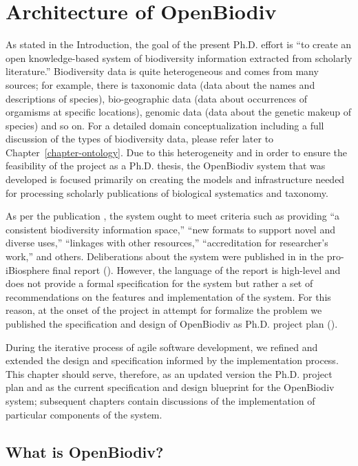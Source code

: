 \chapter{Architecture of OpenBiodiv}
\label{chapter-openbiodiv}

As stated in the Introduction, the goal of the present Ph.D. effort is ``to create an open knowledge-based system of biodiversity information extracted from scholarly literature.'' Biodiversity data is quite heterogeneous and comes from many sources; for example, there is taxonomic data (data about the names and descriptions of species), bio-geographic data (data about occurrences of orgamisms at specific locations), genomic data (data about the genetic makeup of species) and so on. For a detailed domain conceptualization including a full discussion of the types of biodiversity data, please refer later to Chapter~\ref{chapter-ontology}. Due to this heterogeneity and in order to ensure the feasibility of the project as a Ph.D. thesis, the OpenBiodiv system that was developed is focused primarily on creating the models and infrastructure needed for processing scholarly publications of biological systematics and taxonomy. 

As per the publication \cite{noauthor_open_2014}, the system ought to meet criteria such as providing ``a consistent biodiversity information space,'' ``new formats to support novel and diverse uses,'' ``linkages with other resources,'' ``accreditation for researcher's work,'' and others. Deliberations about the system were published in in the pro-iBiosphere final report (\cite{soraya_sierra_coordination_2014}). However, the language of the report is high-level and does not provide a formal specification for the system but rather a set of recommendations on the features and implementation of the system. For this reason, at the onset of the project in attempt for formalize the problem we published the specification and design of OpenBiodiv as Ph.D. project plan (\cite{senderov_open_2016}).

During the iterative process of agile software development, we refined and extended the design and specification informed by the implementation process. This chapter should serve, therefore, as an updated version the Ph.D. project plan and as the current specification and design blueprint for the OpenBiodiv system; subsequent chapters contain discussions of the implementation of particular components of the system.

\section{What is OpenBiodiv?}

